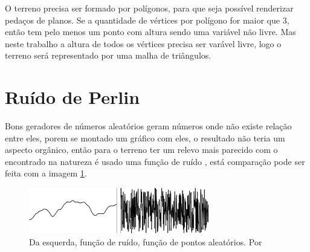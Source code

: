 O terreno precisa ser formado por polígonos, para que seja possível renderizar pedaços de planos.
Se a quantidade de vértices por polígono for maior que $3$, então tem pelo menos um ponto com altura sendo uma 
variável não livre. Mas neste trabalho a altura de todos os vértices precisa ser varável livre, logo o terreno será representado por uma malha de triângulos.
%

\section{Ruído de Perlin}
Bons geradores de números aleatórios geram números onde não existe relação entre
eles, porem se montado um gráfico com eles, o resultado não teria um aspecto
orgânico, então para o terreno ter um relevo mais parecido com o encontrado na 
natureza é usado uma função de ruído \cite{shiffman2012nature}, está comparação
pode ser feita com a imagem \ref{fig:randomAndNoise}. 
\begin{figure}[H]
    \centering
    \includegraphics[width=0.7\textwidth]{figuras/randomAndNoise.png}
    \caption{Da esquerda, função de ruído, função de pontos aleatórios. Por \cite{shiffman2012nature}}
    \label{fig:randomAndNoise}
\end{figure}

